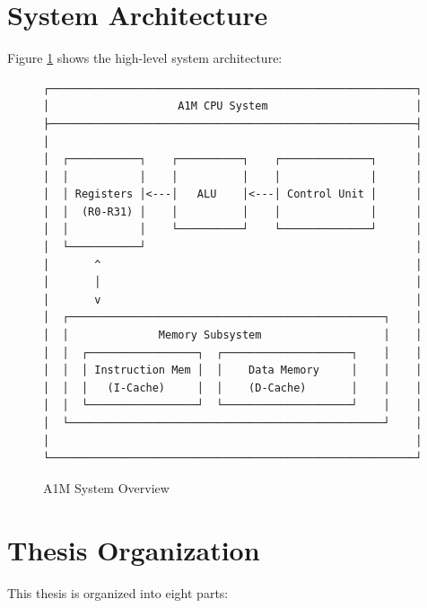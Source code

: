 \documentclass[12pt,a4paper,oneside]{book}
\begin{document}
\section{System Architecture}

Figure \ref{fig:system-overview} shows the high-level system architecture:

\begin{figure}[H]
\centering
\begin{verbatim}
┌─────────────────────────────────────────────────────────┐
│                    A1M CPU System                       │
├─────────────────────────────────────────────────────────┤
│                                                         │
│  ┌───────────┐    ┌──────────┐    ┌──────────────┐      │
│  │           │    │          │    │              │      │
│  │ Registers │<---│   ALU    │<---│ Control Unit │      │
│  │  (R0-R31) │    │          │    │              │      │
│  │           │    └──────────┘    └──────────────┘      │
│  └───────────┘                                          │
│       ^                                                 │
│       │                                                 │
│       v                                                 │
│  ┌─────────────────────────────────────────────────┐    │
│  │              Memory Subsystem                   │    │
│  │  ┌─────────────────┐  ┌────────────────────┐    │    │
│  │  │ Instruction Mem │  │    Data Memory     │    │    │
│  │  │   (I-Cache)     │  │    (D-Cache)       │    │    │
│  │  └─────────────────┘  └────────────────────┘    │    │
│  └─────────────────────────────────────────────────┘    │
│                                                         │
└─────────────────────────────────────────────────────────┘
\end{verbatim}
\caption{A1M System Overview}
\label{fig:system-overview}
\end{figure}

\section{Thesis Organization}

This thesis is organized into eight parts:
\end{document}
